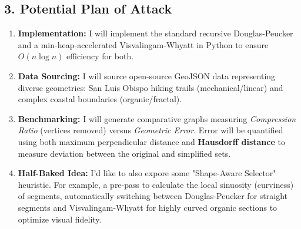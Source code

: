 \documentclass[11pt]{article}
\begin{document}
\subsection*{3. Potential Plan of Attack}
\begin{enumerate}
    \item \textbf{Implementation:} I will implement the standard recursive Douglas-Peucker and a min-heap-accelerated Visvalingam-Whyatt in Python to ensure $O(n \log n)$ efficiency for both.
    \item \textbf{Data Sourcing:} I will source open-source GeoJSON data representing diverse geometries: San Luis Obispo hiking trails (mechanical/linear) and complex coastal boundaries (organic/fractal).
    \item \textbf{Benchmarking:} I will generate comparative graphs measuring \textit{Compression Ratio} (vertices removed) versus \textit{Geometric Error}. Error will be quantified using both maximum perpendicular distance and \textbf{Hausdorff distance} to measure deviation between the original and simplified sets.
    \item \textbf{Half-Baked Idea:} I'd like to also expore some "Shape-Aware Selector" heuristic. For example, a pre-pass to calculate the local sinuosity (curviness) of segments, automatically switching between Douglas-Peucker for straight segments and Visvalingam-Whyatt for highly curved organic sections to optimize visual fidelity.
\end{enumerate}
\end{document}
